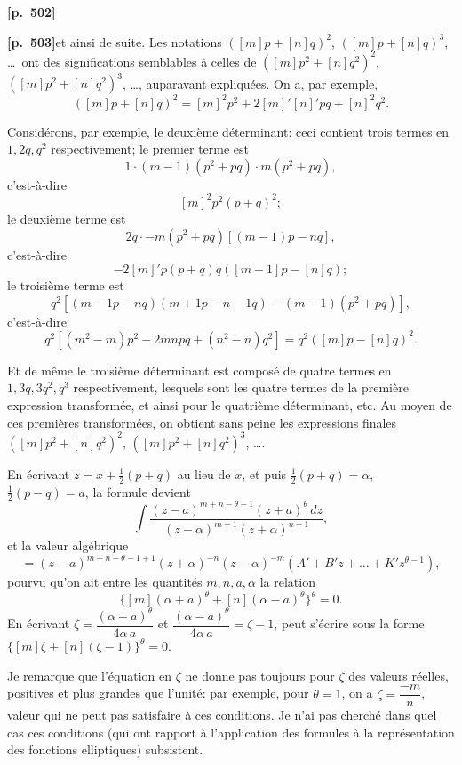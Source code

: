 \documentclass[11pt,a4paper]{article}
\begin{document}
\noindent\textbf{[p.~502]}

\noindent\textbf{[p.~503]}\quad et ainsi de suite. Les notations $([m]p + [n]q)^{2}$, $([m]p + [n]q)^{3}$, \ldots\ ont des significations semblables \`a celles de $([m]p^{2} + [n]q^{2})^{2}$, $([m]p^{2} + [n]q^{2})^{3}$, \ldots, auparavant expliqu\'ees. On a, par exemple,
\[
([m]p + [n]q)^{2} = [m]^{2} p^{2} + 2[m]'[n]' pq + [n]^{2} q^{2}.
\]

Consid\'erons, par exemple, le deuxi\`eme d\'eterminant: ceci contient trois termes en $1, 2q, q^{2}$ respectivement; le premier terme est
\[
1 \cdot (m - 1)(p^{2} + pq) \cdot m(p^{2} + pq),
\]
c'est-\`a-dire
\[
[m]^{2} p^{2}(p + q)^{2};
\]
le deuxi\`eme terme est
\[
2q \cdot -m(p^{2} + pq)[(m - 1)p - nq],
\]
c'est-\`a-dire
\[
-2[m]' p (p + q) q ([m - 1]p - [n]q);
\]
le troisi\`eme terme est
\[
q^{2}[(m - 1p - nq)(m + 1p - n - 1q) - (m - 1)(p^{2} + pq)],
\]
c'est-\`a-dire
\[
q^{2}[(m^{2} - m)p^{2} - 2mnpq + (n^{2} - n)q^{2}] = q^{2}([m]p - [n]q)^{2}.
\]

Et de m\^eme le troisi\`eme d\'eterminant est compos\'e de quatre termes en $1, 3q, 3q^{2}, q^{3}$ respectivement, lesquels sont les quatre termes de la premi\`ere expression transform\'ee, et ainsi pour le quatri\`eme d\'eterminant, etc. Au moyen de ces premi\`eres transform\'ees, on obtient sans peine les expressions finales $([m]p^{2} + [n]q^{2})^{2}$, $([m]p^{2} + [n]q^{2})^{3}$, \ldots.

En \'ecrivant $z = x + \frac{1}{2}(p + q)$ au lieu de $x$, et puis $\frac{1}{2}(p + q) = \alpha$, $\frac{1}{2}(p - q) = a$, la formule devient
\[
\int \frac{(z - a)^{m + n - \theta - 1}(z + a)^{\theta}\,dz}{(z - \alpha)^{m + 1}(z + \alpha)^{n + 1}},
\]
et la valeur alg\'ebrique
\[
= (z - a)^{m + n - \theta - 1 + 1}(z + \alpha)^{-n}(z - \alpha)^{-m}(A' + B'z + \ldots + K'z^{\theta - 1}),
\]
pourvu qu'on ait entre les quantit\'es $m, n, a, \alpha$ la relation
\[
\{[m](\alpha + a)^{\theta} + [n](\alpha - a)^{\theta}\}^{\theta} = 0.
\]
En \'ecrivant $\zeta = \dfrac{(\alpha + a)^{\theta}}{4\alpha\,a}$ et $\dfrac{(\alpha - a)^{\theta}}{4\alpha\,a} = \zeta - 1$, peut s'\'ecrire sous la forme $\{[m]\zeta + [n](\zeta - 1)\}^{\theta} = 0$.

Je remarque que l'\'equation en $\zeta$ ne donne pas toujours pour $\zeta$ des valeurs r\'eelles, positives et plus grandes que l'unit\'e: par exemple, pour $\theta = 1$, on a $\zeta = \dfrac{-m}{n}$, valeur qui ne peut pas satisfaire \`a ces conditions. Je n'ai pas cherch\'e dans quel cas ces conditions (qui ont rapport \`a l'application des formules \`a la repr\'esentation des fonctions elliptiques) subsistent.
\end{document}
